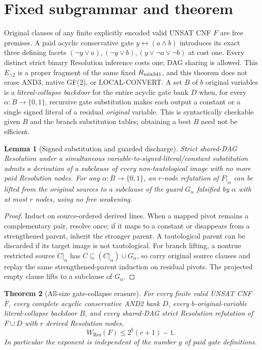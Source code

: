 \documentclass[11pt]{article}
\newtheorem{theorem}{Theorem}
\newtheorem{lemma}[theorem]{Lemma}
\begin{document}
\section*{Fixed subgrammar and theorem}
Original clauses of any finite explicitly encoded valid UNSAT CNF $F$ are free premises. A paid acyclic conservative gate $y\leftrightarrow(a\land b)$ introduces its exact three defining facets $(\neg y\vee a),(\neg y\vee b),(y\vee\neg a\vee\neg b)$ at cost one. Every distinct strict binary Resolution inference costs one; DAG sharing is allowed. This $E_{\land2}$ is a proper fragment of the same fixed $R_{\rm mix341}$, and this theorem does not erase AND3, native GF(2), or LOCAL-CONVERT.
A set $B$ of $b$ original variables is a \emph{literal-collapse backdoor} for the entire acyclic gate bank $D$ when, for every $\alpha:B\to\{0,1\}$, recursive gate substitution makes each output a constant or a single signed literal of a residual \emph{original} variable. This is syntactically checkable given $B$ and the branch substitution tables; obtaining a best $B$ need not be efficient.
\begin{lemma}[Signed substitution and guarded discharge]
Strict shared-DAG Resolution under a simultaneous variable-to-signed-literal/constant substitution admits a derivation of a subclause of every non-tautological image with no more paid Resolution nodes. For any $\alpha:B\to\{0,1\}$, an $r$-node refutation of $F|_\alpha$ can be lifted from the original sources to a subclause of the guard $G_\alpha$ falsified by $\alpha$ with at most $r$ nodes, using no free weakening.
\end{lemma}
\begin{proof}
Induct on source-ordered derived lines. When a mapped pivot remains a complementary pair, resolve once; if it maps to a constant or disappears from a strengthened parent, inherit the stronger parent. A tautological parent can be discarded if its target image is not tautological. For branch lifting, a nontrue restricted source $C|_\alpha$ has $C\subseteq (C|_\alpha)\cup G_\alpha$, so carry original source clauses and replay the same strengthened-parent induction on residual pivots. The projected empty clause lifts to a subclause of $G_\alpha$.
\end{proof}
\begin{theorem}[All-size gate-collapse erasure]
For every finite valid UNSAT CNF $F$, every complete acyclic conservative AND2 bank $D$, every $b$-original-variable literal-collapse backdoor $B$, and every shared-DAG strict Resolution refutation of $F\cup D$ with $r$ derived Resolution nodes,
\[
\boxed{ W_{\mathrm{Res}}(F)\le2^b(r+1)-1. }
\]
In particular the exponent is independent of the number $g$ of paid gate definitions.
\end{theorem}
\end{document}
